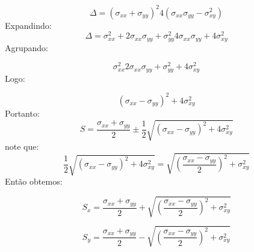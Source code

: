 \documentclass[
12pt,
a4paper,
oneside,
chapter=TITLE,
sumario=tradicional
]{abntex2}
\begin{document}
\begin{equation*}
\Delta =(\sigma_{xx}+\sigma_{yy})^2
4(\sigma_{xx}\sigma_{yy}-\sigma_{xy}^2)  
\end{equation*}
Expandindo:
\begin{equation*} 
\Delta =\sigma_{xx}^2  
+  
2\sigma_{xx}\sigma_{yy}  
+  
\sigma_{yy}^2
4\sigma_{xx}\sigma_{yy}  
+  
4\sigma_{xy}^2  
\end{equation*}
Agrupando:

\begin{equation*}
\sigma_{xx}^2
2\sigma_{xx}\sigma_{yy}  
+  
\sigma_{yy}^2  
+  
4\sigma_{xy}^2  
\end{equation*}
Logo:

\begin{equation*}
(\sigma_{xx}-\sigma_{yy})^2 + 4\sigma_{xy}^2  
\end{equation*}
Portanto:
\begin{equation*}
S=  
\frac{\sigma_{xx}+\sigma_{yy}}{2}  
\pm  
\frac{1}{2}  
\sqrt{  
	(\sigma_{xx}-\sigma_{yy})^2 + 4\sigma_{xy}^2  
}  
\end{equation*}
note que:
\begin{equation*}
\frac{1}{2}  
\sqrt{  
	(\sigma_{xx}-\sigma_{yy})^2 + 4\sigma_{xy}^2  
}
=
\sqrt{  
	\left(  
	\frac{\sigma_{xx}-\sigma_{yy}}{2}  
	\right)^2  
	+  
	\sigma_{xy}^2  
}  
\end{equation*}
Então obtemos:
%

\begin{tcolorbox}[colback=red!5, colframe=red!40!black, title=\textbf{Componentes longitudinal e transversal do material anisotrópico.}]
\begin{equation}
	\boxed{ 	
		S_x =  
		\frac{\sigma_{xx}+\sigma_{yy}}{2}  
		+  
		\sqrt{  
			\left(  
			\frac{\sigma_{xx}-\sigma_{yy}}{2}  
			\right)^2  
			+  
			\sigma_{xy}^2  
		} 
		\label{eq:SigmaLongitudinal_001}  
	}
\end{equation}

\begin{equation}
	\boxed{ 
		S_y =  
		\frac{\sigma_{xx}+\sigma_{yy}}{2}
		-
		\sqrt{  
			\left(  
			\frac{\sigma_{xx}-\sigma_{yy}}{2}  
			\right)^2  
			+  
			\sigma_{xy}^2  
		} 
		\label{eq:SigmaTransversal_001}
	}  
\end{equation}
\end{tcolorbox}
\end{document}
